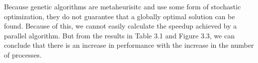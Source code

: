 Because genetic algorithms are metaheurisitc and use some form of stochastic optimization, they do not guarantee that a globally optimal solution can be found. Because of this, we cannot easily calculate the speedup achieved by a parallel algorithm. But from the results in Table 3.1 and Figure 3.3, we can conclude that there is an increase in performance with the increase in the number of processes.